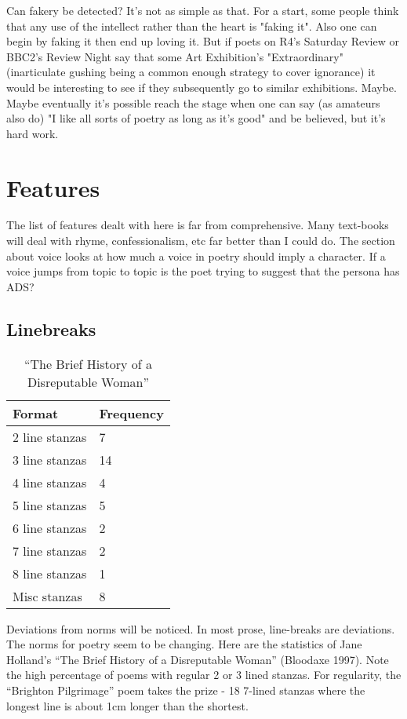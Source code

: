 \documentclass[11pt]{article}
\begin{document}
Can fakery be detected? It's not as simple as that. For a start, some people think that any use of the intellect rather than the heart is "faking it". Also one can begin by faking it then end up loving it. But if poets on R4's Saturday Review or BBC2's Review Night say that some Art Exhibition's "Extraordinary" (inarticulate gushing being a common enough strategy to cover ignorance) it would be interesting to see if they subsequently go to similar exhibitions. Maybe. Maybe eventually it's possible reach the stage when one can say (as amateurs also do) "I like all sorts of poetry as long as it's good" and be believed, but it's hard work.


\newpage
\section{Features}
The list of features dealt with here is far from comprehensive. Many text-books
will deal with rhyme, confessionalism, etc far better than I could do. The section about voice looks at how much a voice in
poetry should imply a character. If a voice jumps from topic to topic is the poet trying to suggest that the persona has ADS?


\subsection{Linebreaks}
\begin{table}[htbp]
\centering
\begin{tabular}{|l|l|}\hline
\textbf{Format} & \textbf{Frequency}\\\hline
2 line stanzas & 7\\
3 line stanzas & 14\\
4 line stanzas & 4\\
5 line stanzas & 5\\
6 line stanzas & 2\\
7 line stanzas & 2\\
8 line stanzas & 1\\
Misc stanzas & 8\\\hline
\end{tabular}
\caption{``The Brief History of a Disreputable Woman''}
\end{table}
Deviations from norms will be noticed. In most prose, line-breaks are deviations. The norms for poetry seem to be changing.   Here are the statistics of Jane Holland's ``The Brief History of a Disreputable Woman'' (Bloodaxe 1997). Note the high percentage of poems with regular 2 or 3 lined stanzas. For regularity, the ``Brighton Pilgrimage'' poem takes the prize - 18 7-lined stanzas
where the longest line is about 1cm longer than the shortest.
\end{document}
